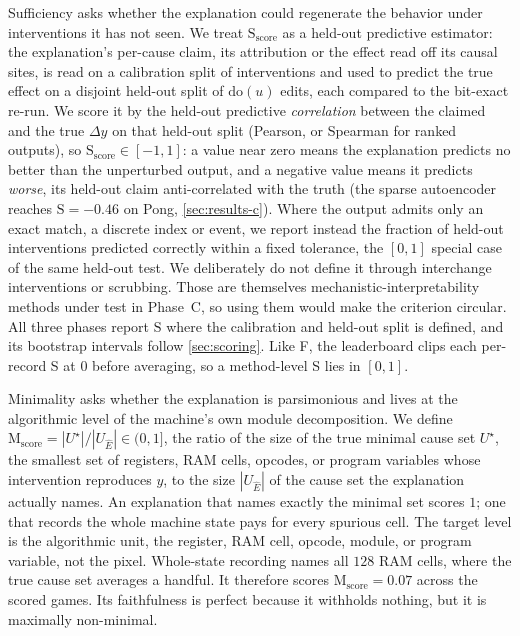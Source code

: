 Sufficiency asks whether the explanation could regenerate the behavior under interventions it
has not seen. We treat $\mathrm{S}_{\mathrm{score}}$ as a held-out predictive estimator: the
explanation's per-cause claim, its attribution or the effect read off its causal sites, is
read on a calibration split of interventions and used to predict the true effect on a disjoint
held-out split of $\mathrm{do}(u)$ edits, each compared to the bit-exact re-run. We score it by
the held-out predictive \emph{correlation} between the claimed and the true $\Delta y$ on that
held-out split (Pearson, or Spearman for ranked outputs), so
$\mathrm{S}_{\mathrm{score}}\in[-1,1]$: a value near zero means the explanation predicts no
better than the unperturbed output, and a negative value means it predicts \emph{worse}, its
held-out claim anti-correlated with the truth (the sparse autoencoder reaches
$\mathrm{S}=-0.46$ on Pong, \Sectionname\ref{sec:results-c}). Where the output admits only an
exact match, a discrete index or event, we report instead the fraction of held-out
interventions predicted correctly within a fixed tolerance, the $[0,1]$ special case of the
same held-out test. We deliberately do not define it through interchange interventions or
scrubbing. Those are themselves mechanistic-interpretability methods under test in Phase~C, so
using them would make the criterion circular. All three phases report $\mathrm{S}$ where the
calibration and held-out split is defined, and its bootstrap intervals follow
\Sectionname\ref{sec:scoring}. Like F, the leaderboard clips each per-record S at $0$ before
averaging, so a method-level S lies in $[0,1]$.

Minimality asks whether the explanation is parsimonious and lives at the algorithmic level of
the machine's own module decomposition. We define
$\mathrm{M}_{\mathrm{score}}=|U^\star|/|U_{\hat{E}}|\in(0,1]$, the ratio of the size of the
true minimal cause set $U^\star$, the smallest set of registers, RAM cells, opcodes, or
program variables whose intervention reproduces $y$, to the size $|U_{\hat{E}}|$ of the cause
set the explanation actually names. An explanation that names exactly the minimal set scores
$1$; one that records the whole machine state pays for every spurious cell. The target level
is the algorithmic unit, the register, RAM cell, opcode, module, or program variable, not the
pixel. Whole-state recording names all $128$ RAM cells, where the true cause set averages a
handful. It therefore scores $\mathrm{M}_{\mathrm{score}}=0.07$ across the scored games. Its
faithfulness is perfect because it withholds nothing, but it is maximally non-minimal.

